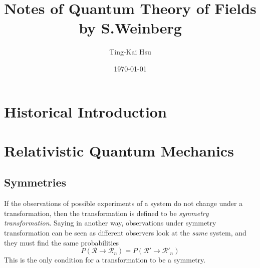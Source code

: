 \documentclass[12pt]{article}
\title{Notes of Quantum Theory of Fields by S.Weinberg}
\author{Ting-Kai Hsu}
\date{\today}
\numberwithin{equation}{section}
\begin{document}
\maketitle
\tableofcontents
\section{Historical Introduction}
\section{Relativistic Quantum Mechanics}
\subsection{Symmetries}
If the observations of possible experiments of a system do not change under a transformation, then the transformation is defined to be \textit{symmetry transformation}.
Saying in another way, observations under symmetry transformation can be seen as different observers look at the \textit{same} system, and they must find the same probabilities
\begin{equation}
    P(\mathcal{R}\rightarrow\mathcal{R}_n) = P(\mathcal{R'}\rightarrow\mathcal{R}'_n)
\end{equation} 
This is the only condition for a transformation to be a symmetry.
\end{document}
